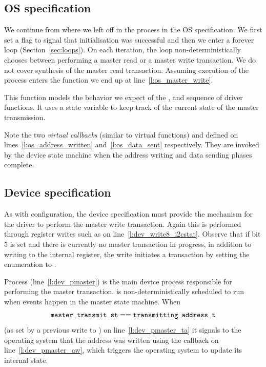 \subsection{OS specification}
We continue from where we left off in the  process in the OS specification. We first set a flag to signal that initialisation was successful and then we enter a forever loop (Section~\ref{sec:loops}). On each iteration, the loop non-deterministically chooses between performing a master read or a master write transaction. We do not cover synthesis of the master read transaction. Assuming execution of the process enters the  function we end up at line~\ref{l:os_master_write}.

This function models the behavior we expect of the ,  and  sequence of driver functions. It uses a state variable  to keep track of the current state of the master transmission. 

Note the two \emph{virtual callbacks} (similar to virtual functions)  and  defined on lines~\ref{l:os_address_written} and~\ref{l:os_data_sent} respectively. They are invoked by the device state machine when the address writing and data sending phases complete. 

\subsection{Device specification}
As with configuration, the device specification must provide the mechanism for the driver to perform the master write transaction. Again this is performed through register writes such as  on line~\ref{l:dev_write8_i2cstat}. Observe that if bit 5 is set and there is currently no master transaction in progress, in addition to writing to the internal register, the write initiates a transaction by setting the enumeration  to . 

Process  (line~\ref{l:dev_pmaster}) is the main device process responsible for performing the master transaction.  is non-deterministically scheduled to run when events happen in the master state machine. When 
$$
\texttt{master\_transmit\_st} == \texttt{transmitting\_address\_t} 
$$
(as set by a previous write to ) on line~\ref{l:dev_pmaster_ta} it signals to the operating system that the address was written using the  callback on line~\ref{l:dev_pmaster_aw}, which triggers the operating system to update its internal state.

